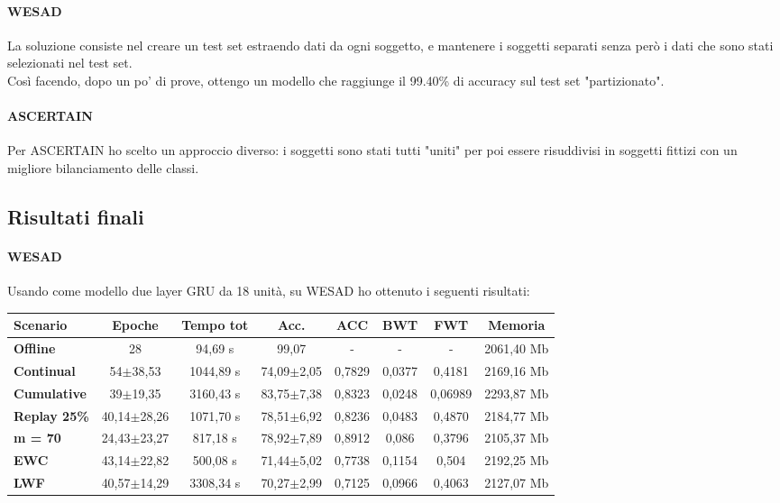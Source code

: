 \documentclass[11pt, a4paper, twoside, openright]{book}
\begin{document}
\paragraph{WESAD} La soluzione consiste nel creare un test set estraendo dati da ogni soggetto, e mantenere i soggetti separati senza però i dati che sono stati selezionati nel test set.\\
Così facendo, dopo un po' di prove, ottengo un modello che raggiunge il 99.40\% di accuracy sul test set "partizionato".

\paragraph{ASCERTAIN} Per ASCERTAIN ho scelto un approccio diverso: i soggetti sono stati tutti "uniti" per poi essere risuddivisi in soggetti fittizi con un migliore bilanciamento delle classi.

\subsection{Risultati finali}
\paragraph{WESAD} Usando come modello due layer GRU da 18 unità, su WESAD ho ottenuto i seguenti risultati:\\
\begin{tabular}{l|c|c|c|c|c|c|c}
\textbf{Scenario} & \textbf{Epoche} & \textbf{Tempo tot} & \textbf{Acc.} & \textbf{ACC} & \textbf{BWT} & \textbf{FWT} & \textbf{Memoria}\\
\hline
 \textbf{Offline} & 28 & 94,69 s & 99,07 & - & - & - & 2061,40 Mb\\
\textbf{Continual} & 54$\pm$38,53 & 1044,89 s & 74,09$\pm$2,05 & 0,7829 & 0,0377 & 0,4181 & 2169,16 Mb\\
\textbf{Cumulative} & 39$\pm$19,35 & 3160,43 s & 83,75$\pm$7,38 & 0,8323 & 0,0248 & 0,06989 & 2293,87 Mb\\
\textbf{Replay 25\%} & 40,14$\pm$28,26 & 1071,70 s & 78,51$\pm$6,92 & 0,8236 & 0,0483 & 0,4870 & 2184,77 Mb\\
\textbf{m = 70} & 24,43$\pm$23,27 & 817,18 s & 78,92$\pm$7,89 & 0,8912 & 0,086 & 0,3796 & 2105,37 Mb\\
\textbf{EWC} & 43,14$\pm$22,82 & 500,08 s & 71,44$\pm$5,02 & 0,7738 & 0,1154 & 0,504 & 2192,25 Mb\\
\textbf{LWF} & 40,57$\pm$14,29 & 3308,34 s & 70,27$\pm$2,99 & 0,7125 & 0,0966 & 0,4063 & 2127,07 Mb\\
\end{tabular}
\end{document}
